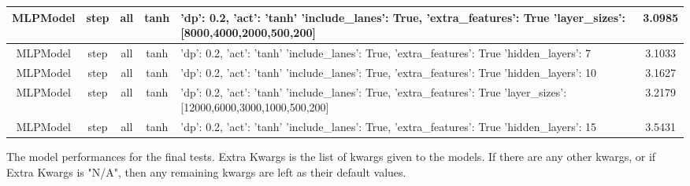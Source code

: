 \documentclass{article}
\newenvironment{changemargin}[2]{%
\begin{list}{}{%
\setlength{\topsep}{0pt}%
\setlength{\leftmargin}{#1}%
\setlength{\rightmargin}{#2}%
\setlength{\listparindent}{\parindent}%
\setlength{\itemindent}{\parindent}%
\setlength{\parsep}{\parskip}%
}%
\item[]}{\end{list}}
\begin{document}
\begin{changemargin}{-3.75cm}{-2cm}
\begin{minipage}{\linewidth}
\begin{tabular}{|c|c|c|c|p{7.25cm}|c| }
MLPModel & step & all & tanh & 'dp': 0.2, 'act': 'tanh' \newline 'include\_lanes': True, 'extra\_features': True \newline 'layer\_sizes': [8000,4000,2000,500,200] & 3.0985 \\\hline
MLPModel & step & all & tanh & 'dp': 0.2, 'act': 'tanh' \newline 'include\_lanes': True, 'extra\_features': True \newline 'hidden\_layers': 7 & 3.1033 \\\hline
MLPModel & step & all & tanh & 'dp': 0.2, 'act': 'tanh' \newline 'include\_lanes': True, 'extra\_features': True \newline 'hidden\_layers': 10 & 3.1627 \\\hline
MLPModel & step & all & tanh & 'dp': 0.2, 'act': 'tanh' \newline 'include\_lanes': True, 'extra\_features': True \newline 'layer\_sizes': [12000,6000,3000,1000,500,200] & 3.2179 \\\hline
MLPModel & step & all & tanh & 'dp': 0.2, 'act': 'tanh' \newline 'include\_lanes': True, 'extra\_features': True \newline 'hidden\_layers': 15 & 3.5431 \\\hline
\bottomrule[1.25pt]
\end {tabular}\par
\bigskip
The model performances for the final tests. Extra Kwargs is the list of kwargs given to the models. If there are any other kwargs, or if Extra Kwargs is "N/A", then any remaining kwargs are left as their default values.
\end{minipage}
\end{changemargin}
\end{document}
